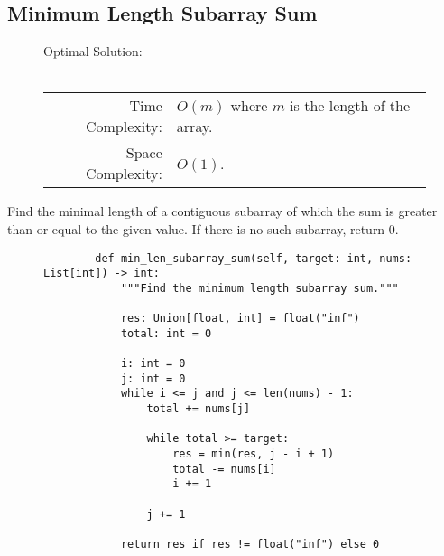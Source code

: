 
\subsection{Minimum Length Subarray Sum}

\begin{figure}[H]
    Optimal Solution:\\\\
    \begin{tabular}{rl}
        Time Complexity:& \(O(m)\) where \(m\) is the length of the array.\\
        Space Complexity:& \(O(1)\).
    \end{tabular}
\end{figure}

Find the minimal length of a contiguous subarray of which the sum is greater
than or equal to the given value. If there is no such subarray, return \(0\).

\begin{figure}[H]
    \centering
    \begin{verbatim}
        def min_len_subarray_sum(self, target: int, nums: List[int]) -> int:
            """Find the minimum length subarray sum."""

            res: Union[float, int] = float("inf")
            total: int = 0
            
            i: int = 0
            j: int = 0
            while i <= j and j <= len(nums) - 1:
                total += nums[j]

                while total >= target:
                    res = min(res, j - i + 1)
                    total -= nums[i]
                    i += 1

                j += 1

            return res if res != float("inf") else 0
    \end{verbatim}
\end{figure}
